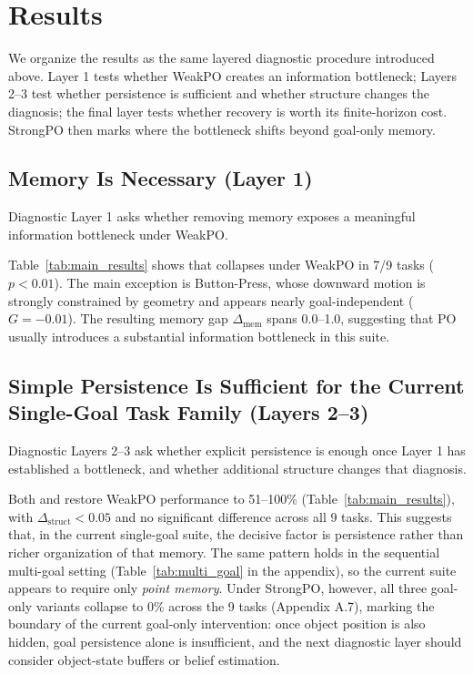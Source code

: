 \section{Results}
\label{sec:results}

We organize the results as the same layered diagnostic procedure introduced above. Layer 1 tests whether WeakPO creates an information bottleneck; Layers 2--3 test whether persistence is sufficient and whether structure changes the diagnosis; the final layer tests whether recovery is worth its finite-horizon cost. StrongPO then marks where the bottleneck shifts beyond goal-only memory.

\subsection{Memory Is Necessary (Layer 1)}

Diagnostic Layer 1 asks whether removing memory exposes a meaningful information bottleneck under WeakPO.

Table~\ref{tab:main_results} shows that  collapses under WeakPO in 7/9 tasks ($p < 0.01$). The main exception is Button-Press, whose downward motion is strongly constrained by geometry and appears nearly goal-independent ($G=-0.01$). The resulting memory gap $\Delta_{\text{mem}}$ spans 0.0--1.0, suggesting that PO usually introduces a substantial information bottleneck in this suite.



\subsection{Simple Persistence Is Sufficient for the Current Single-Goal Task Family (Layers 2--3)}

Diagnostic Layers 2--3 ask whether explicit persistence is enough once Layer 1 has established a bottleneck, and whether additional structure changes that diagnosis.

Both  and  restore WeakPO performance to 51--100\% (Table~\ref{tab:main_results}), with $\Delta_{\text{struct}}<0.05$ and no significant difference across all 9 tasks. This suggests that, in the current single-goal suite, the decisive factor is persistence rather than richer organization of that memory. The same pattern holds in the sequential multi-goal setting (Table~\ref{tab:multi_goal} in the appendix), so the current suite appears to require only \emph{point memory}. Under StrongPO, however, all three goal-only variants collapse to 0\% across the 9 tasks (Appendix A.7), marking the boundary of the current goal-only intervention: once object position is also hidden, goal persistence alone is insufficient, and the next diagnostic layer should consider object-state buffers or belief estimation.


